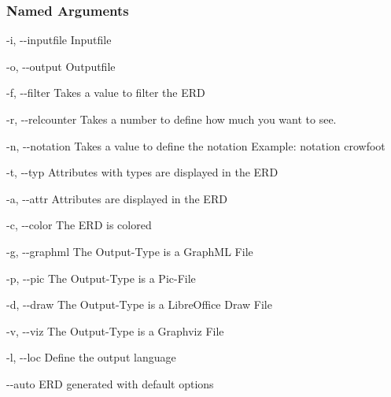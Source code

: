 \documentclass[letterpaper,10pt,english,openany,oneside]{sphinxmanual}
\begin{document}
\begin{sphinxVerbatim}[commandchars=\\\{\}]
  \PYG{p}{[}\PYG{p}{]} \PYG{p}{[} \PYG{p}{]} \PYG{p}{[} \PYG{p}{]} \PYG{p}{[} \PYG{p}{]} \PYG{p}{[} \PYG{p}{]}
               \PYG{p}{[} \PYG{p}{]} \PYG{p}{[} \PYG{p}{]} \PYG{p}{[}\PYG{p}{]} \PYG{p}{[}\PYG{p}{]} \PYG{p}{[}\PYG{p}{]} \PYG{p}{[}\PYG{p}{]} \PYG{p}{[}\PYG{p}{]} \PYG{p}{[}\PYG{p}{]} \PYG{p}{[} \PYG{p}{]}
               \PYG{p}{[}\PYG{p}{]}
\end{sphinxVerbatim}


\subsubsection{Named Arguments}
\label{\detokenize{cmd_main:Named Arguments_repeat5}}\begin{optionlist}{3cm}
\item [-i, -{-}inputfile]  
Inputfile
\item [-o, -{-}output]  
Outputfile
\item [-f, -{-}filter]  
Takes a value to filter the ERD
\item [-r, -{-}relcounter]  
Takes a number to define how much you want to see.
\item [-n, -{-}notation]  
Takes a value to define the notation
Example: \textendash{}notation crowfoot
\item [-t, -{-}typ]  
Attributes with types are displayed in the ERD
\item [-a, -{-}attr]  
Attributes are displayed in the ERD
\item [-c, -{-}color]  
The ERD is colored
\item [-g, -{-}graphml]  
The Output-Type is a GraphML File
\item [-p, -{-}pic]  
The Output-Type is a Pic-File
\item [-d, -{-}draw]  
The Output-Type is a LibreOffice Draw File
\item [-v, -{-}viz]  
The Output-Type is a Graphviz File
\item [-l, -{-}loc]  
Define the output language
\item [-{-}auto]  
ERD generated with default options
\end{optionlist}
\end{document}

